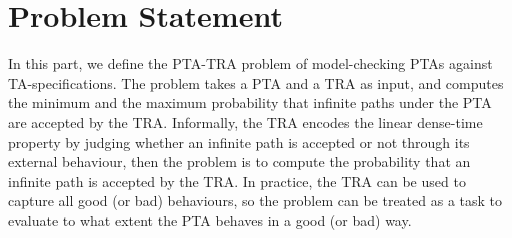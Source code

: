 \vspace{-1.8em}
\section{Problem Statement}
\vspace{-1em}
In this part, we define the {\sc PTA-TRA} problem of model-checking {PTAs} against TA-specifications.
The problem takes a PTA and a TRA as input, and computes the minimum and the maximum probability that infinite paths under the PTA are accepted by the TRA.
Informally, the TRA encodes the linear dense-time property by judging whether an infinite path is accepted or not through its external behaviour,
then the problem is to compute the probability that an infinite path is accepted by the TRA.
In practice, the TRA can be used to capture all good (or bad) behaviours, so the problem can be treated as a task to evaluate to what extent the PTA behaves in a good (or bad) way.

